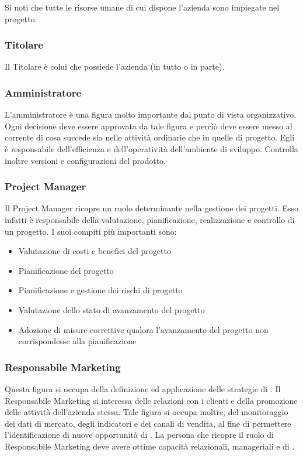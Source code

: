 Si noti che tutte le risorse umane di cui dispone l'azienda sono impiegate nel progetto.

	\subsubsection{Titolare}
	Il Titolare è colui che possiede l'azienda (in tutto o in parte).
	\subsubsection{Amministratore}		
	L'amministratore è una figura molto importante dal punto di vista organizzativo. Ogni decisione deve essere approvata da 	tale figura e perciò deve essere messo al corrente di cosa succede sia nelle attività ordinarie che in quelle di progetto.
	Egli è responsabile dell'efficienza e dell'operatività dell'ambiente di sviluppo. Controlla inoltre versioni e configurazioni del prodotto.
	\subsubsection{Project Manager}
	Il Project Manager ricopre un ruolo determinante nella gestione dei progetti. Esso infatti è responsabile della valutazione, pianificazione, realizzazione e controllo di un progetto.
	I suoi compiti più importanti sono:
	\begin{itemize}
		\item Valutazione di costi e benefici del progetto
		\item Pianificazione del progetto
		\item Pianificazione e gestione dei rischi di progetto
		\item Valutazione dello stato di avanzamento del progetto
		\item Adozione di misure correttive qualora l'avanzamento del progetto non corrispondesse alla pianificazione

	\end{itemize}

\subsubsection{Responsabile Marketing}
	Questa figura si occupa della definizione ed applicazione delle strategie di . Il Responsabile Marketing si interessa delle relazioni con i clienti e della promozione delle attività dell'azienda stessa. Tale figura si occupa inoltre, del monitoraggio dei dati di mercato, degli indicatori e dei canali di vendita, al fine di permettere l'identificazione di nuove opportunità di . La persona che ricopre il ruolo di Responsabile Marketing deve avere ottime capacità relazionali, manageriali e di . 
